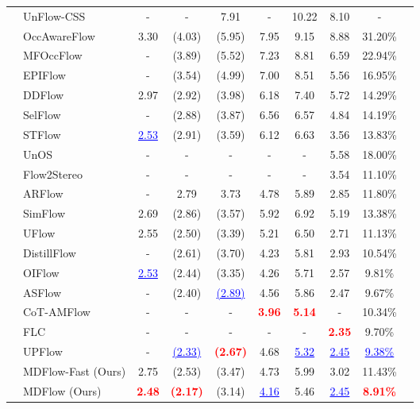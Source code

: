 \documentclass[lettersize,journal]{IEEEtran}
\begin{document}
\begin{table*}[t]
\begin{tabular}{llcccccccc}
		\midrule
		 & UnFlow-CSS~\cite{Meister:2018:UUL} & - & - & 7.91 & - & 10.22 & 8.10 & - \\
		 & OccAwareFlow~\cite{8578611} & 3.30 & (4.03) & (5.95) & 7.95 & 9.15 & 8.88 & 31.20\% \\
		 & MFOccFlow~\cite{Janai_2018_ECCV} & - & (3.89) & (5.52) & 7.23 & 8.81 & 6.59 & 22.94\% \\
		 & EPIFlow~\cite{8953885} & - & (3.54) & (4.99) & 7.00 & 8.51 & 5.56 & 16.95\% \\
		 & DDFlow~\cite{Liu:2019:DDFlow} & 2.97 & (2.92) & (3.98) & 6.18 & 7.40 & 5.72 & 14.29\% \\
		 & SelFlow~\cite{Liu:2019:SelFlow} & - & (2.88) & (3.87) & 6.56 & 6.57 & 4.84 & 14.19\% \\
		 & STFlow~\cite{9201360} & \textcolor{blue}{\underline{2.53}} & (2.91) & (3.59) & 6.12 & 6.63 & 3.56 & 13.83\% \\
		 & UnOS~\cite{Wang_2019_CVPR} & - & - & - & - & - & 5.58 & 18.00\% \\
		 & Flow2Stereo~\cite{Flow2Stereo} & - & - & - & - & - & 3.54 & 11.10\% \\
		 & ARFlow~\cite{Liu_2020_CVPR} & - & 2.79 & 3.73 & 4.78 & 5.89 & 2.85 & 11.80\% \\
		 & SimFlow~\cite{10.1007/978-3-030-58586-0_11} & 2.69 & (2.86) & (3.57) & 5.92 & 6.92 & 5.19 & 13.38\% \\
		 & UFlow~\cite{10.1007/978-3-030-58536-5_33} & 2.55 & (2.50) & (3.39) & 5.21 & 6.50 & 2.71 & 11.13\% \\
		 & DistillFlow~\cite{9444870} & - & (2.61) & (3.70) & 4.23 & 5.81 & 2.93 & 10.54\% \\
		 & OIFlow~\cite{9477059} & \textcolor{blue}{\underline{2.53}} & (2.44) & (3.35) & 4.26 & 5.71 & 2.57 & 9.81\% \\
		 & ASFlow~\cite{9625946} & - & (2.40) & \textcolor{blue}{\underline{(2.89)}} & 4.56 & 5.86 & 2.47 & 9.67\% \\
		 & CoT-AMFlow~\cite{Wang_CoRL_2020} & - & - & - & \textcolor{red}{\textbf{3.96}} & \textcolor{red}{\textbf{5.14}} & - & 10.34\% \\
		 & FLC~\cite{Chi_2021_CVPR} & - & - & - & - & - & \textcolor{red}{\textbf{2.35}} & 9.70\% \\
		 & UPFlow~\cite{Luo_2021_CVPR} & - & \textcolor{blue}{\underline{(2.33)}} & \textcolor{red}{\textbf{(2.67)}} & 4.68 & \textcolor{blue}{\underline{5.32}} & \textcolor{blue}{\underline{2.45}} & \textcolor{blue}{\underline{9.38\%}} \\
		 & MDFlow-Fast (Ours) & 2.75 & (2.53) & (3.47) & 4.73 & 5.99 & 3.02 & 11.43\% \\
		 & MDFlow (Ours) & \textcolor{red}{\textbf{2.48}} & \textcolor{red}{\textbf{(2.17)}} & (3.14) & \textcolor{blue}{\underline{4.16}} & 5.46 & \textcolor{blue}{\underline{2.45}} & \textcolor{red}{\textbf{8.91\%}} \\
		\bottomrule
	\end{tabular}
\end{table*}
\end{document}
